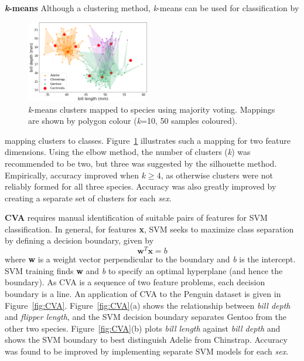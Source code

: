 \documentclass[a4paper, 11pt]{article}
\begin{document}
\textbf{\textit{k}-means} Although a clustering method, 
\textit{k}-means can be used for classification by 
\begin{figure} %
  \centering
  \vspace{-0.8\baselineskip} %
  \includegraphics[width=0.48\textwidth]{kmeansmap.png} %
  \vspace{-0.5\baselineskip} %
  \caption{\centering\linespread{0.8}\selectfont \textit{k}-means clusters mapped to species using majority voting. 
  Mappings are shown by polygon colour (\textit{k}=10, 50 samples coloured).}
  \vspace{-1\baselineskip} %
  \label{fig:kmeansmap}
\end{figure}
mapping clusters to classes. 
Figure~\ref{fig:kmeansmap} illustrates such a mapping for two feature dimensions.
Using the elbow method, the number of clusters (\textit{k}) was recommended to be two, but three was suggested 
by the silhouette method. Empirically, accuracy improved when \(k \geq 4\),
as otherwise clusters were not reliably formed for all three species.   
Accuracy was also greatly improved by creating a separate set of clusters for each \textit{sex}.

\textbf{CVA}  
requires manual identification of suitable pairs of features for SVM classification. 
In general, for features \textbf{x}, SVM seeks to maximize class separation by defining a decision boundary, given by
\vspace{-0\baselineskip} %
\begin{equation}
\mathbf{w}^T \mathbf{x} = b
\end{equation}
where \textbf{w} is a weight vector perpendicular to the boundary and \textit{b} is the intercept. 
SVM training finds \textbf{w} and \textit{b} to specify an optimal hyperplane (and hence the boundary). 
As CVA is a sequence of two feature problems, each decision boundary is a line.
An application of CVA to the Penguin dataset is given in Figure~\ref{fig:CVA}. 
Figure~\ref{fig:CVA}(a) shows the relationship between \textit{bill depth} and \textit{flipper length}, and
the SVM decision boundary separates Gentoo from the other two species. 
Figure~\ref{fig:CVA}(b) plots \textit{bill length} against \textit{bill depth} and shows the SVM boundary to best
distinguish Adelie from Chinstrap. Accuracy was found to be improved by implementing separate SVM models for each \textit{sex}.
\end{document}
